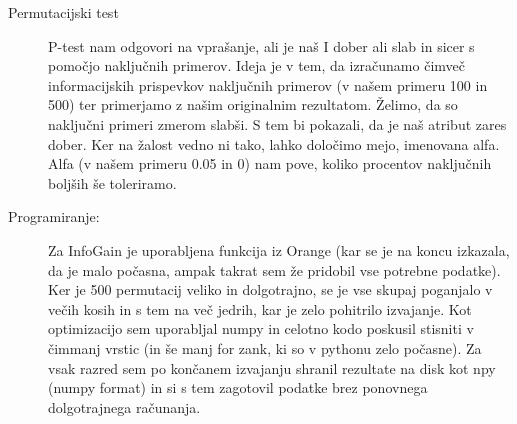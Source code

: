 \documentclass[a4paper,11pt]{article}
\begin{document}
\begin{description}
\item[Permutacijski test] P-test nam odgovori na vprašanje, ali je naš I dober ali slab in sicer s pomočjo naključnih primerov. Ideja je v tem, da izračunamo čimveč informacijskih prispevkov naključnih primerov (v našem primeru 100 in 500) ter primerjamo z našim originalnim rezultatom. Želimo, da so naključni primeri zmerom slabši. S tem bi pokazali, da je naš atribut zares dober. Ker na žalost vedno ni tako, lahko določimo mejo, imenovana alfa. Alfa (v našem primeru 0.05 in 0) nam pove, koliko procentov naključnih boljših še toleriramo.
\item[Programiranje: ] Za InfoGain je uporabljena funkcija iz Orange (kar se je na koncu izkazala, da je malo počasna, ampak takrat sem že pridobil vse potrebne podatke). Ker je 500 permutacij veliko in dolgotrajno, se je vse skupaj poganjalo v večih kosih in s tem na več jedrih, kar je zelo pohitrilo izvajanje. Kot optimizacijo sem uporabljal numpy in celotno kodo poskusil stisniti v čimmanj vrstic (in še manj for zank, ki so v pythonu zelo počasne). Za vsak razred sem po končanem izvajanju shranil rezultate na disk kot npy (numpy format) in si s tem zagotovil podatke brez ponovnega dolgotrajnega računanja.
\end{description}
\end{document}
